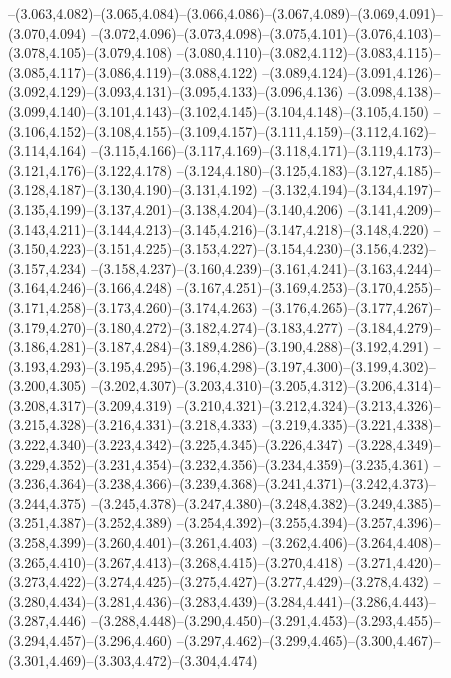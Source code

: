   --(3.063,4.082)--(3.065,4.084)--(3.066,4.086)--(3.067,4.089)--(3.069,4.091)--(3.070,4.094)%
  --(3.072,4.096)--(3.073,4.098)--(3.075,4.101)--(3.076,4.103)--(3.078,4.105)--(3.079,4.108)%
  --(3.080,4.110)--(3.082,4.112)--(3.083,4.115)--(3.085,4.117)--(3.086,4.119)--(3.088,4.122)%
  --(3.089,4.124)--(3.091,4.126)--(3.092,4.129)--(3.093,4.131)--(3.095,4.133)--(3.096,4.136)%
  --(3.098,4.138)--(3.099,4.140)--(3.101,4.143)--(3.102,4.145)--(3.104,4.148)--(3.105,4.150)%
  --(3.106,4.152)--(3.108,4.155)--(3.109,4.157)--(3.111,4.159)--(3.112,4.162)--(3.114,4.164)%
  --(3.115,4.166)--(3.117,4.169)--(3.118,4.171)--(3.119,4.173)--(3.121,4.176)--(3.122,4.178)%
  --(3.124,4.180)--(3.125,4.183)--(3.127,4.185)--(3.128,4.187)--(3.130,4.190)--(3.131,4.192)%
  --(3.132,4.194)--(3.134,4.197)--(3.135,4.199)--(3.137,4.201)--(3.138,4.204)--(3.140,4.206)%
  --(3.141,4.209)--(3.143,4.211)--(3.144,4.213)--(3.145,4.216)--(3.147,4.218)--(3.148,4.220)%
  --(3.150,4.223)--(3.151,4.225)--(3.153,4.227)--(3.154,4.230)--(3.156,4.232)--(3.157,4.234)%
  --(3.158,4.237)--(3.160,4.239)--(3.161,4.241)--(3.163,4.244)--(3.164,4.246)--(3.166,4.248)%
  --(3.167,4.251)--(3.169,4.253)--(3.170,4.255)--(3.171,4.258)--(3.173,4.260)--(3.174,4.263)%
  --(3.176,4.265)--(3.177,4.267)--(3.179,4.270)--(3.180,4.272)--(3.182,4.274)--(3.183,4.277)%
  --(3.184,4.279)--(3.186,4.281)--(3.187,4.284)--(3.189,4.286)--(3.190,4.288)--(3.192,4.291)%
  --(3.193,4.293)--(3.195,4.295)--(3.196,4.298)--(3.197,4.300)--(3.199,4.302)--(3.200,4.305)%
  --(3.202,4.307)--(3.203,4.310)--(3.205,4.312)--(3.206,4.314)--(3.208,4.317)--(3.209,4.319)%
  --(3.210,4.321)--(3.212,4.324)--(3.213,4.326)--(3.215,4.328)--(3.216,4.331)--(3.218,4.333)%
  --(3.219,4.335)--(3.221,4.338)--(3.222,4.340)--(3.223,4.342)--(3.225,4.345)--(3.226,4.347)%
  --(3.228,4.349)--(3.229,4.352)--(3.231,4.354)--(3.232,4.356)--(3.234,4.359)--(3.235,4.361)%
  --(3.236,4.364)--(3.238,4.366)--(3.239,4.368)--(3.241,4.371)--(3.242,4.373)--(3.244,4.375)%
  --(3.245,4.378)--(3.247,4.380)--(3.248,4.382)--(3.249,4.385)--(3.251,4.387)--(3.252,4.389)%
  --(3.254,4.392)--(3.255,4.394)--(3.257,4.396)--(3.258,4.399)--(3.260,4.401)--(3.261,4.403)%
  --(3.262,4.406)--(3.264,4.408)--(3.265,4.410)--(3.267,4.413)--(3.268,4.415)--(3.270,4.418)%
  --(3.271,4.420)--(3.273,4.422)--(3.274,4.425)--(3.275,4.427)--(3.277,4.429)--(3.278,4.432)%
  --(3.280,4.434)--(3.281,4.436)--(3.283,4.439)--(3.284,4.441)--(3.286,4.443)--(3.287,4.446)%
  --(3.288,4.448)--(3.290,4.450)--(3.291,4.453)--(3.293,4.455)--(3.294,4.457)--(3.296,4.460)%
  --(3.297,4.462)--(3.299,4.465)--(3.300,4.467)--(3.301,4.469)--(3.303,4.472)--(3.304,4.474)%
